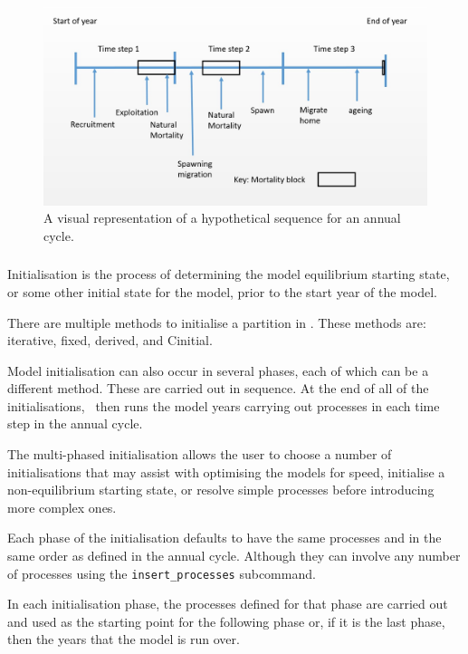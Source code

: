 \begin{figure}[H]
	\centering
	\includegraphics[scale=0.5]{Figures/annual_cycle.jpg}
	\caption{A visual representation of a hypothetical sequence for an annual cycle.}\label{Fig:annual}
\end{figure}

\subsubsection{}

Initialisation is the process of determining the model equilibrium starting state, or some other initial state for the model, prior to the start year of the model.

There are multiple methods to initialise a partition in \CNAME. These methods are: iterative, fixed, derived, and Cinitial. 

Model initialisation can also occur in several phases, each of which can be a different method. These are carried out in sequence. At the end of all of the initialisations, \CNAME\ then runs the model years carrying out processes in each time step in the annual cycle.

The multi-phased initialisation allows the user to choose a number of initialisations that may assist with optimising the models for speed, initialise a non-equilibrium starting state, or resolve simple processes before introducing more complex ones.

Each phase of the initialisation defaults to have the same processes and in the same order as defined in the annual cycle. Although they can involve any number of processes using the \texttt{insert\_processes} subcommand.

In each initialisation phase, the processes defined for that phase are carried out and used as the starting point for the following phase or, if it is the last phase, then the years that the model is run over. 

